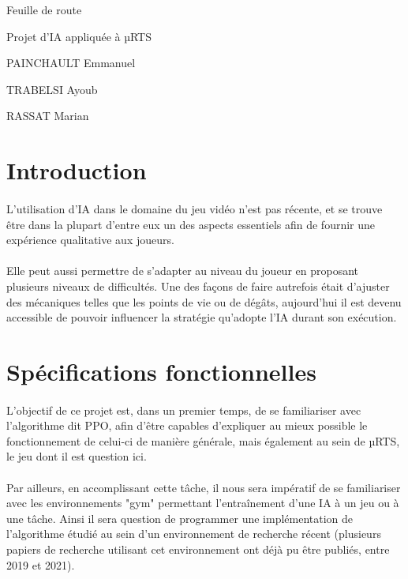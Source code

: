 \documentclass[french]{article}
\begin{document}
	
	\Huge{Feuille de route}
	
	\Large{Projet d'IA appliquée à µRTS} \hfill
	\vspace{10mm}
	
	\small
		\hfill PAINCHAULT Emmanuel
		
		\hfill TRABELSI Ayoub
		
		\hfill RASSAT Marian
		
	\vspace{5mm}
	
	\section*{Introduction}
		\paragraph*{}
		L’utilisation d’IA dans le domaine du jeu vidéo n’est pas récente, et se trouve être dans la plupart d’entre eux un des aspects essentiels afin de fournir une expérience qualitative aux joueurs.
	
		\paragraph*{}
		Elle peut aussi permettre de s’adapter au niveau du joueur en proposant plusieurs niveaux de difficultés. Une des façons de faire autrefois était d’ajuster des mécaniques telles que les points de vie ou de dégâts, aujourd’hui il est devenu accessible de pouvoir influencer la stratégie qu'adopte l’IA durant son exécution.
		
		
	\section{Spécifications fonctionnelles}
		\paragraph*{}
		L'objectif de ce projet est, dans un premier temps, de se familiariser avec l'algorithme dit PPO, afin d'être capables d'expliquer au mieux possible le fonctionnement de celui-ci de manière générale, mais également au sein de µRTS, le jeu dont il est question ici.
		
		\paragraph*{}
		Par ailleurs, en accomplissant cette tâche, il nous sera impératif de se familiariser avec les environnements "gym" permettant l'entraînement d'une IA à un jeu ou à une tâche. Ainsi il sera question de programmer une implémentation de l'algorithme étudié au sein d'un environnement de recherche récent (plusieurs papiers de recherche utilisant cet environnement ont déjà pu être publiés, entre 2019 et 2021).
		
\end{document}
